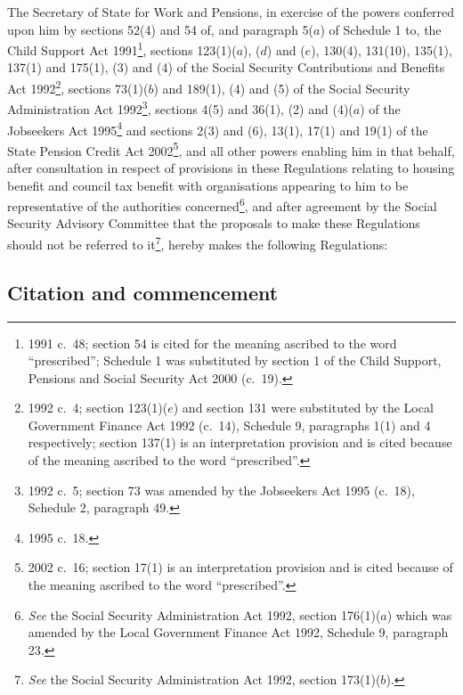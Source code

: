 \documentclass[12pt,a4paper]{article}
\title{\regstitle}
\author{S.I.\ 2003 No.\ 1195}
\date{Made
30th April 2003\\
Laid before Parliament
6th May 2003\\
Coming into force
in accordance with regulation 1
}
\begin{document}
\maketitle

\noindent
The Secretary of State for Work and Pensions, in exercise of the powers conferred upon him by sections 52(4) and 54 of, and paragraph 5($a$)  of Schedule 1 to, the Child Support Act 1991\footnote{1991 c.\ 48; section 54 is cited for the meaning ascribed to the word “prescribed”; Schedule 1 was substituted by section 1 of the Child Support, Pensions and Social Security Act 2000 (c.\ 19).}, sections 123(1)($a$), ($d$)  and ($e$), 130(4), 131(10), 135(1), 137(1) and 175(1), (3) and (4) of the Social Security Contributions and Benefits Act 1992\footnote{1992 c.\ 4; section 123(1)($e$) and section 131 were substituted by the Local Government Finance Act 1992 (c.\ 14), Schedule 9, paragraphs 1(1) and 4 respectively; section 137(1) is an interpretation provision and is cited because of the meaning ascribed to the word “prescribed”.}, sections 73(1)($b$)  and 189(1), (4) and (5) of the Social Security Administration Act 1992\footnote{1992 c.\ 5; section 73 was amended by the Jobseekers Act 1995 (c.\ 18), Schedule 2, paragraph 49.}, sections 4(5) and 36(1), (2) and (4)($a$)  of the Jobseekers Act 1995\footnote{1995 c.\ 18.} and sections 2(3) and (6), 13(1), 17(1) and 19(1) of the State Pension Credit Act 2002\footnote{2002 c.\ 16; section 17(1) is an interpretation provision and is cited because of the meaning ascribed to the word “prescribed”.}, and all other powers enabling him in that behalf, after consultation in respect of provisions in these Regulations relating to housing benefit and council tax benefit with organisations appearing to him to be representative of the authorities concerned\footnote{\emph{See} the Social Security Administration Act 1992, section 176(1)($a$) which was amended by the Local Government Finance Act 1992, Schedule 9, paragraph 23.}, and after agreement by the Social Security Advisory Committee that the proposals to make these Regulations should not be referred to it\footnote{\emph{See} the Social Security Administration Act 1992, section 173(1)($b$).}, hereby makes the following Regulations: 

{\sloppy

\tableofcontents

}

\bigskip

\setcounter{secnumdepth}{-2}

\subsection[1. Citation and commencement]{Citation and commencement}
\end{document}
